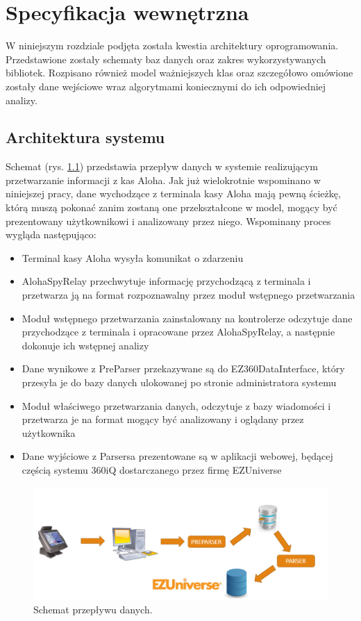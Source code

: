\documentclass[a4paper]{book}
\begin{document}
\chapter{Specyfikacja wewnętrzna}
W niniejszym rozdziale podjęta została kwestia architektury oprogramowania. Przedstawione zostały schematy baz danych oraz zakres wykorzystywanych bibliotek. Rozpisano również model ważniejszych klas oraz szczegółowo omówione zostały dane wejściowe wraz algorytmami koniecznymi do ich odpowiedniej analizy.
\section{Architektura systemu}
Schemat (rys. \ref{fig:schemat_przeplywu_danych}) przedstawia przepływ danych w systemie realizującym przetwarzanie informacji z kas Aloha.
Jak już wielokrotnie wspominano w niniejszej pracy, dane wychodzące z terminala kasy Aloha mają pewną ścieżkę, którą muszą pokonać zanim zostaną one przekształcone w model, mogący być prezentowany użytkownikowi i analizowany przez niego. Wspominany proces wygląda następująco:
 \begin{itemize}
	\item Terminal kasy Aloha wysyła komunikat o zdarzeniu
	\item AlohaSpyRelay przechwytuje informację przychodzącą z terminala i przetwarza ją na format rozpoznawalny przez moduł wstępnego przetwarzania
	\item Moduł wstępnego przetwarzania zainstalowany na kontrolerze odczytuje dane przychodzące z terminala i opracowane przez AlohaSpyRelay, a następnie dokonuje ich wstępnej analizy
	\item Dane wynikowe z PreParser przekazywane są do EZ360DataInterface, który przesyła je do bazy danych ulokowanej po stronie administratora systemu
	\item Moduł właściwego przetwarzania danych, odczytuje z bazy wiadomości i przetwarza je na format mogący być analizowany i oglądany przez użytkownika
	\item Dane wyjściowe z Parsersa prezentowane są w aplikacji webowej, będącej częścią systemu 360iQ dostarczanego przez firmę EZUniverse
\end{itemize}
\begin{figure}[h]
	\centering
	\includegraphics[width=\textwidth]{./img/schemat_przeplywu_danych.png}
	\caption{Schemat przepływu danych.}
	\label{fig:schemat_przeplywu_danych}
\end{figure}
\end{document}
